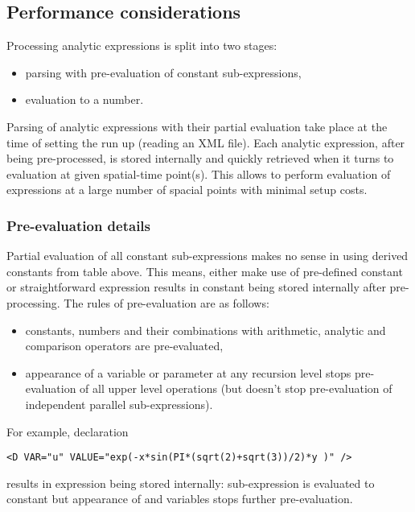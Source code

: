 \subsection{Performance considerations}
Processing analytic expressions is split into two stages:
\begin{itemize}
\item parsing with pre-evaluation of constant sub-expressions,
\item evaluation to a number.
\end{itemize}
Parsing of analytic expressions with their partial evaluation take place at the
time of setting the run up (reading an XML file). Each analytic expression,
after being pre-processed, is stored internally and quickly retrieved when it
turns to evaluation at given spatial-time point(s). This allows to perform
evaluation of expressions at a large number of spacial points with minimal setup
costs.

\subsubsection{Pre-evaluation details}
Partial evaluation of all constant sub-expressions makes no sense in using
derived constants from table above. This means, either make use of pre-defined
constant  or straightforward expression 
results in constant  being stored internally after
pre-processing. The rules of pre-evaluation are as follows:
\begin{itemize}
\item constants, numbers and their combinations with arithmetic, analytic and
 comparison operators are pre-evaluated,
\item appearance of a variable or parameter
 at any recursion level stops pre-evaluation of all upper level operations (but
 doesn't stop pre-evaluation of independent parallel sub-expressions).
\end{itemize}

For example, declaration 
\begin{lstlisting}[style=XMLStyle]
     <D VAR="u" VALUE="exp(-x*sin(PI*(sqrt(2)+sqrt(3))/2)*y )" />
\end{lstlisting}
results in expression  being
stored internally: sub-expression  is
evaluated to constant but appearance of  and  variables
stops further pre-evaluation.

